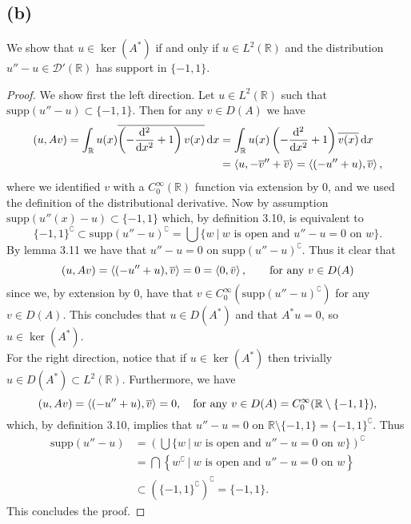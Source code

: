\documentclass[a4paper,11pt]{article}
\newcommand{\supp}{\text{supp}}
\newcommand*\diff{\mathop{}\!\mathrm{d}}
\newcommand{\R}{\mathbb{R}}
\numberwithin{equation}{section}
\begin{document}
\subsection*{(b)}
We show that $ u\in\ker(A^*) $ if and only if $ u\in L^2(\R) $ and the distribution $ u''-u\in\mathcal{D}'(\R) $ has support in $ \{-1,1\} $.
\begin{proof}
	We show first the left direction. Let $ u\in L^2(\R) $ such that $ \supp(u''-u)\subset\{-1,1\} $. Then for any $ v\in D(A) $ we have \begin{equation}
	\begin{aligned}
	(u,Av)=\int_{\R}u(x) \overline{\left(-\frac{\diff^2}{\diff x^2}+1\right)v(x)} \diff x&=\int_{\R}u(x) \left(-\frac{\diff^2}{\diff x^2}+1\right)\overline{v(x)} \diff x\\&=\braket{u,-\overline{v}''+\overline{v}}=\braket{ (-u''+u),\overline{v}},
	\end{aligned}
	\end{equation}
	where we identified $ v $ with a $ C^\infty_0(\R) $ function via extension by $ 0 $, and we used the definition of the distributional derivative.
	Now by assumption $ \supp(u''(x)-u)\subset\{-1,1\} $ which, by definition 3.10, is equivalent to $$ \{-1,1\}^\complement\subset\supp(u''-u)^\complement=\bigcup\{w\ \vert\ w\text{ is open and }u''-u=0\text{ on }w \}. $$
	By lemma 3.11 we have that $ u''-u=0 $ on $ \supp(u''-u)^\complement $.
	Thus it clear that \begin{equation}
	(u,Av)=\braket{ (-u''+u),\overline{v}}=0=\braket{0,\bar{v}}, \qquad\text{for any } v\in D(A)
	\end{equation} 
	since we, by extension by $ 0 $, have that $ v\in C^{\infty}_0\left(\supp(u''-u)^\complement\right) $ for any $ v\in D(A) $. This concludes that $ u\in D(A^*) $ and that $ A^*u=0 $, so $ u\in\ker(A^*) $.\\
	For the right direction, notice that if $ u\in \ker(A^*) $ then trivially $ u\in D(A^*)\subset L^2(\R) $. Furthermore, we have \begin{equation}
	(u,Av)=\braket{ (-u''+u),\overline{v}}=0,\quad \text{for any }v\in D(A)=C_0^\infty(\R\setminus\{-1,1\}),
	\end{equation}
	which, by definition 3.10, implies that $ u''-u=0 $ on $ \R\setminus\{-1,1\}=\{-1,1\}^\complement $. Thus \begin{equation}
	\begin{aligned}
	\supp(u''-u)&=\left(\bigcup\{w\ \vert\ w\text{ is open and }u''-u=0\text{ on }w \}\right)^\complement\\&
	=\bigcap\left\{w^\complement \ \vert\ w\text{ is open and }u''-u=0\text{ on }w \right\}\\&
	\subset\left(\{-1,1\}^\complement\right)^\complement=\{-1,1\}.
	\end{aligned}
	\end{equation}
	This concludes the proof.
\end{proof}
\end{document}
